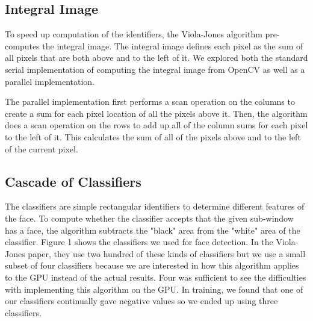 \documentclass[12pt] {article}
\begin{document}
\subsection{Integral Image}
To speed up computation of the identifiers, the Viola-Jones algorithm pre-computes the integral image. The integral image defines each pixel as the sum of all pixels that are both above and to the left of it. We explored both the standard serial implementation of computing the integral image from OpenCV as well as a parallel implementation.

The parallel implementation first performs a scan operation on the columns to create a sum for each pixel location of all the pixels above it. Then, the algorithm does a scan operation on the rows to add up all of the column sums for each pixel to the left of it. This calculates the sum of all of the pixels above and to the left of the current pixel.


\subsection{Cascade of Classifiers}
The classifiers are simple rectangular identifiers to determine different features of the face. To compute whether the classifier accepts that the given sub-window has a face, the algorithm subtracts the "black" area from the "white" area of the classifier. Figure 1 shows the classifiers we used for face detection. In the Viola-Jones paper, they use two hundred of these kinds of classifiers but we use a small subset of four classifiers because we are interested in how this algorithm applies to the GPU instead of the actual results. Four was sufficient to see the difficulties with implementing this algorithm on the GPU. In training, we found that one of our classifiers continually gave negative values so we ended up using three classifiers.
\end{document}
